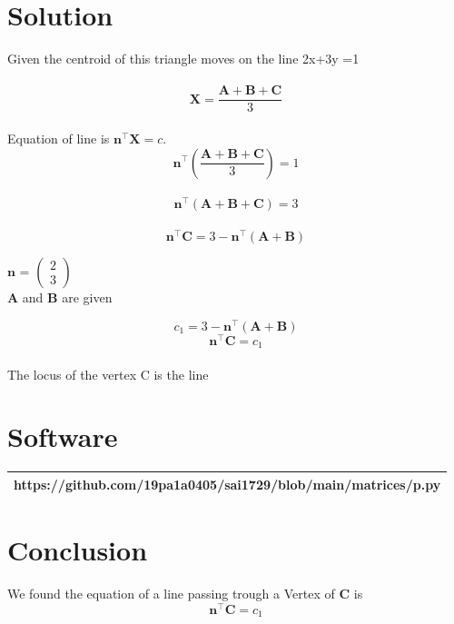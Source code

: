 \documentclass[journal,12pt,twocolumn]{IEEEtran}
\newcommand{\myvec}[1]{\ensuremath{\begin{pmatrix}#1\end{pmatrix}}}
\let\vec\mathbf
\begin{document}
\section{Solution}
Given the centroid of this triangle moves on the line 2x+3y =1 \\
\\
\begin{equation}
\vec{X} = \frac{\vec{A}+\vec{B}+\vec{C}}{3}
\end{equation}
\\
Equation of line is 
${\vec{n^{\top}}\vec{X}} = c$.\\
\begin{equation}
	\vec{n^{\top}}(\frac{\vec{A}+\vec{B}+\vec{C}}{3}) = 1 \label{eq-1}
\end{equation}
\\
\begin{equation}
	\vec{n^{\top}}(\vec{A}+\vec{B}+\vec{C}) = 3  \label{eq-2}
\end{equation}
\\
\begin{equation}
	\vec{n^{\top}}\vec{C} = 3 - \vec{n^{\top}}(\vec{A}+\vec{B})
 \label{eq-3}
\end{equation}
\begin{center}
$\vec{n}$ = \myvec{2\\3} \\
 $\vec{A}$ and $\vec{B}$ are given
\end{center}
\begin{equation}
c_1 = 3 - \vec{n^{\top}}(\vec{A}+\vec{B})
\end{equation}
	\begin{equation}
	\vec{n^{\top}}\vec{C}= c_1 \label{eq-4}
\end{equation}
 \\
 The locus of the vertex C is the line\\

 

\section{Software}
\begin{table}[h]
    \centering
    \begin{tabular}{|c|}
    \hline 
    https://github.com/19pa1a0405/sai1729/blob/main/matrices/p.py  \\
        \hline
    \end{tabular}
\end{table}
\section{Conclusion}
We found the equation of a line passing trough a Vertex of $\vec{C}$
is
\begin{equation}
\vec{n^{\top}}\vec{C} = c_1
\end{equation}
\end{document}
